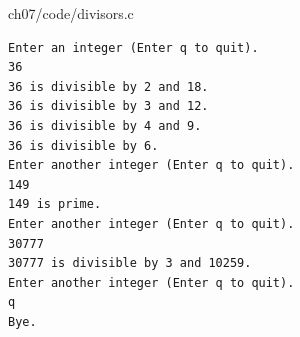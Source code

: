\begin{frame}

{ch07/code/divisors.c}
\end{frame}


\begin{frame}
\begin{lstlisting}
Enter an integer (Enter q to quit).
36
36 is divisible by 2 and 18.
36 is divisible by 3 and 12.
36 is divisible by 4 and 9.
36 is divisible by 6.
Enter another integer (Enter q to quit).
149
149 is prime.
Enter another integer (Enter q to quit).
30777
30777 is divisible by 3 and 10259.
Enter another integer (Enter q to quit).
q
Bye.
\end{lstlisting}
\end{frame}






